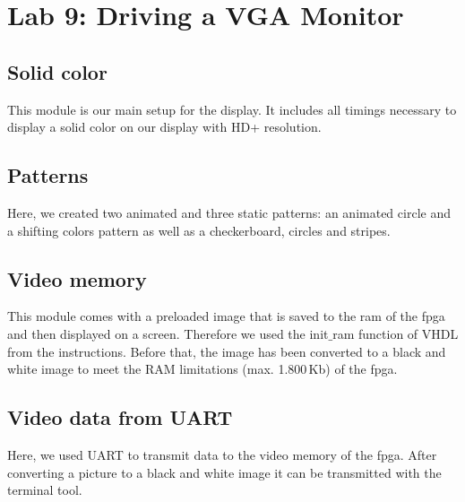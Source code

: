 \chapter{Lab 9: Driving a VGA Monitor}

\section{Solid color}

This module is our main setup for the display. It includes all timings necessary to display a solid color on our display with HD+ resolution.



\section{Patterns}

Here, we created two animated and three static patterns: an animated circle and a shifting colors pattern as well as a checkerboard, circles and stripes.











\section{Video memory}

This module comes with a preloaded image that is saved to the ram of the \gls{fpga} and then displayed on a screen. Therefore we used the init$\_$ram function of VHDL from the instructions. Before that, the image has been converted to a black and white image to meet the RAM limitations (max. 1.800\,Kb) of the \gls{fpga}.





\section{Video data from UART}

Here, we used UART to transmit data to the video memory of the \gls{fpga}. After converting a picture to a black and white image it can be transmitted with the terminal tool.

